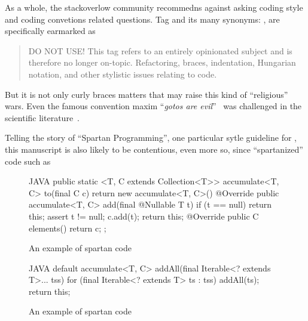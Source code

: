 As a whole, the stackoverlow community 
recommedns against asking coding style and coding convetions related questions. 
Tag  and its many synonyms: , 
 are specifically 
earmarked as 
\begin{quote}
DO NOT USE! This tag refers to an entirely opinionated subject and is therefore 
no longer on-topic. Refactoring, braces, indentation, Hungarian notation, and 
other stylistic issues relating to code. 
\end{quote}
But it is not only curly braces matters that may raise 
this kind of ``religious'' wars. Even the famous convention maxim ``\emph{gotos 
are evil}''~\cite{Dijksta:must be in bib} was challenged in the scientific 
literature~\cite{Knuth: and there are several others}.

Telling the story of ``Spartan Programming'', one particular sytle guideline for 
\Java, this manuscript is also likely to be contentious, even more so, since 
``spartanized'' code such as 

\begin{figure}[h]
\begin{code}{JAVA}
  public static <T, C extends Collection<T>> 
                                accumulate<T, C> to(final C c) {
    return new accumulate<T, C>() {
      @Override public accumulate<T, C> add(final @Nullable T t) {
        if (t == null)
          return this;
        assert t != null;
        c.add(t);
        return this;
      }
      @Override public C elements() {
        return c;
      }
    };
  }
  \end{code}
\label{figure:shock}
\caption{An example of spartan code}
\end{figure}

\begin{figure}[h]
\begin{code}{JAVA}
default accumulate<T, C> addAll(final Iterable<? extends T>... tss) {
  for (final Iterable<? extends T> ts : tss)
    addAll(ts);
  return this;
}
\end{code}
\label{figure:shock-2}
\caption{An example of spartan code}
\end{figure}
  

